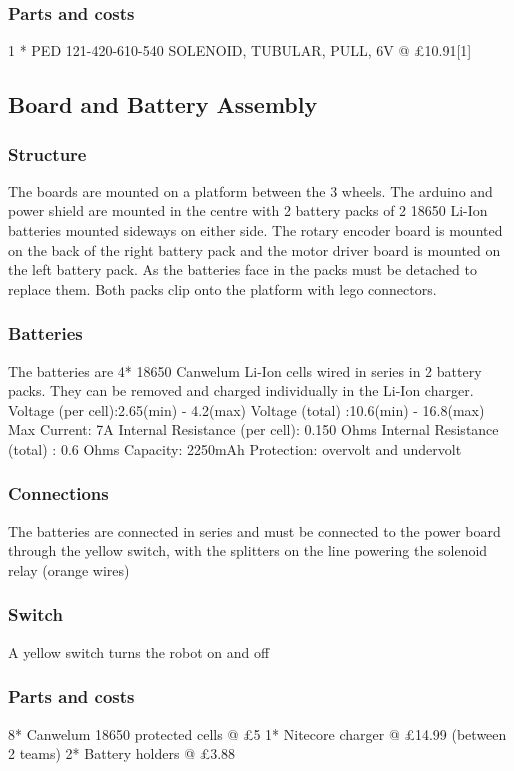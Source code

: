 \documentclass[a4paper]{article}
\begin{document}
\subsubsection{Parts and costs}
1 * PED 	121-420-610-540  SOLENOID, TUBULAR, PULL, 6V @ £10.91[1]

\subsection{Board and Battery Assembly}
\subsubsection{Structure}
The boards are mounted on a platform between the 3 wheels. The arduino and power
shield are mounted in the centre with 2 battery packs of 2 18650 Li-Ion batteries mounted sideways on either
side. The rotary encoder board is
mounted on the back of the right battery pack and the motor driver board is mounted
on the left battery pack. As the batteries face in the packs must be detached to
replace them. Both packs clip onto the platform with lego connectors.

\subsubsection{Batteries}
The batteries are 4* 18650 Canwelum Li-Ion cells wired in series in 2 battery packs. They can be removed and charged individually in the Li-Ion charger.
	Voltage (per cell):2.65(min) - 4.2(max)
    Voltage (total)   :10.6(min) - 16.8(max)
    Max Current: 7A
    Internal Resistance (per cell): 0.150 Ohms
    Internal Resistance (total)   : 0.6   Ohms
    Capacity: 2250mAh
	Protection: overvolt and undervolt
    
\subsubsection{Connections}
The batteries are connected in series and must be connected to the power board through the yellow switch, with the splitters on the line powering the solenoid relay (orange wires)
\subsubsection{Switch}
A yellow switch turns the robot on and off

\subsubsection{Parts and costs}
8* Canwelum 18650 protected cells @ £5
1* Nitecore charger               @ £14.99 (between 2 teams)
2* Battery holders                @ £3.88
\end{document}
